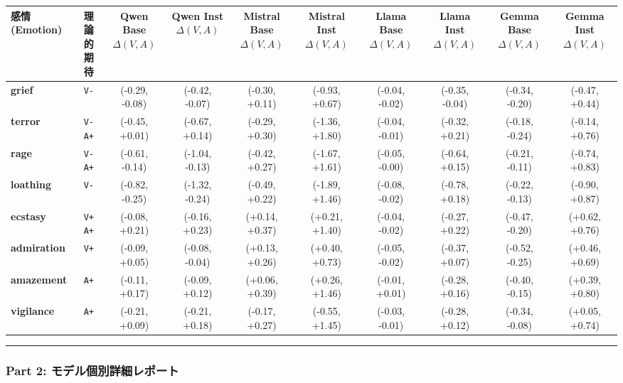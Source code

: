 \begin{center}
\small
\begin{tabular}{lccccccccc}
\toprule
\textbf{感情 (Emotion)} & \textbf{理論的期待} & \textbf{Qwen Base $\Delta(V,A)$} & \textbf{Qwen Inst $\Delta(V,A)$} & \textbf{Mistral Base $\Delta(V,A)$} & \textbf{Mistral Inst $\Delta(V,A)$} & \textbf{Llama Base $\Delta(V,A)$} & \textbf{Llama Inst $\Delta(V,A)$} & \textbf{Gemma Base $\Delta(V,A)$} & \textbf{Gemma Inst $\Delta(V,A)$} \\
\midrule
\textbf{grief} & \texttt{V-} & (-0.29, -0.08) & (-0.42, -0.07) & (-0.30, +0.11) & (-0.93, +0.67) & (-0.04, -0.02) & (-0.35, -0.04) & (-0.34, -0.20) & (-0.47, +0.44) \\
\textbf{terror} & \texttt{V- A+} & (-0.45, +0.01) & (-0.67, +0.14) & (-0.29, +0.30) & (-1.36, +1.80) & (-0.04, -0.01) & (-0.32, +0.21) & (-0.18, -0.24) & (-0.14, +0.76) \\
\textbf{rage} & \texttt{V- A+} & (-0.61, -0.14) & (-1.04, -0.13) & (-0.42, +0.27) & (-1.67, +1.61) & (-0.05, -0.00) & (-0.64, +0.15) & (-0.21, -0.11) & (-0.74, +0.83) \\
\textbf{loathing} & \texttt{V-} & (-0.82, -0.25) & (-1.32, -0.24) & (-0.49, +0.22) & (-1.89, +1.46) & (-0.08, -0.02) & (-0.78, +0.18) & (-0.22, -0.13) & (-0.90, +0.87) \\
\textbf{ecstasy} & \texttt{V+ A+} & (-0.08, +0.21) & (-0.16, +0.23) & (+0.14, +0.37) & (+0.21, +1.40) & (-0.04, -0.02) & (-0.27, +0.22) & (-0.47, -0.20) & (+0.62, +0.76) \\
\textbf{admiration} & \texttt{V+} & (-0.09, +0.05) & (-0.08, -0.04) & (+0.13, +0.26) & (+0.40, +0.73) & (-0.05, -0.02) & (-0.37, +0.07) & (-0.52, -0.25) & (+0.46, +0.69) \\
\textbf{amazement} & \texttt{A+} & (-0.11, +0.17) & (-0.09, +0.12) & (+0.06, +0.39) & (+0.26, +1.46) & (-0.01, +0.01) & (-0.28, +0.16) & (-0.40, -0.15) & (+0.39, +0.80) \\
\textbf{vigilance} & \texttt{A+} & (-0.21, +0.09) & (-0.21, +0.18) & (-0.17, +0.27) & (-0.55, +1.45) & (-0.03, -0.01) & (-0.28, +0.12) & (-0.34, -0.08) & (+0.05, +0.74) \\
\bottomrule
\end{tabular}
\end{center}


\vspace{0.5em}\hrule\vspace{0.5em}

\subsubsection{Part 2: モデル個別詳細レポート}

